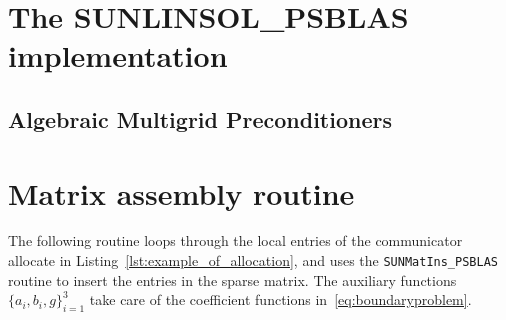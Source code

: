 \documentclass[twoside,a4paper]{refart}
\begin{document}
\section{The SUNLINSOL\_PSBLAS implementation}\label{sec:sunlinsol}

\subsection{Algebraic Multigrid Preconditioners}

\appendix

\section{Matrix assembly routine}
The following routine loops through the local entries of the communicator allocate in Listing~\ref{lst:example_of_allocation}, and uses the \texttt{SUNMatIns\_PSBLAS} routine to insert the entries in the sparse matrix. The auxiliary functions $\{a_{i},b_i,g\}_{i=1}^3$ take care of the coefficient functions in~\eqref{eq:boundaryproblem}.
\end{document}
